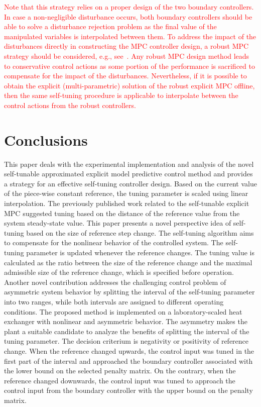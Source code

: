 \documentclass[preprint,12pt]{elsarticle}
\newcommand{\change}[1]{\textcolor{red}{#1}}
\begin{document}
	\change{Note that this strategy relies on a proper design of the two boundary controllers.
	In case a non-negligible disturbance occurs, both boundary controllers
	should be able to solve a disturbance rejection problem as the final
	value of the manipulated variables is interpolated between them. To address the impact of the disturbances directly in constructing the MPC controller design, a robust MPC strategy should be considered, e.g., see~\cite{PR11}. Any robust MPC design method leads to conservative control actions as some portion of the performance is sacrificed to compensate for the impact of the disturbances. Nevertheless, if it is possible to obtain the explicit (multi-parametric) solution of the robust explicit MPC offline, then the same self-tuning procedure is applicable to interpolate between the control actions from the robust controllers.} 
	
	\section{Conclusions}
	\label{sec:conclusion}
	
	This paper deals with the experimental implementation and analysis of the novel self-tunable approximated explicit model predictive control method and provides a strategy for an effective self-tuning controller design. Based on the current value of the piece-wise constant reference, the tuning parameter is scaled using linear interpolation. 
	The previously published work related to the self-tunable explicit MPC suggested tuning based on the distance of the reference value from the system steady-state value. This paper presents a novel perspective idea of self-tuning based on the size of reference step change. The self-tuning algorithm aims to compensate for the nonlinear behavior of the controlled system. The self-tuning parameter is updated whenever the reference changes. The tuning value is calculated as the ratio between the size of the reference change and the maximal admissible size of the reference change, which is specified before operation. 
	Another novel contribution addresses the challenging control problem of asymmetric system behavior by splitting the interval of the self-tuning parameter into two ranges, while both intervals are assigned to different operating conditions. The proposed method is implemented on a laboratory-scaled heat exchanger with nonlinear and asymmetric behavior. The asymmetry makes the plant a suitable candidate to analyze the benefits of splitting the interval of the tuning parameter. The decision criterium is negativity or positivity of reference change. When the reference changed upwards, the control input was tuned in the first part of the interval and approached the boundary controller associated with the lower bound on the selected penalty matrix. On the contrary, when the reference changed downwards, the control input was tuned to approach the control input from the boundary controller with the upper bound on the penalty matrix. 
	
\end{document}
